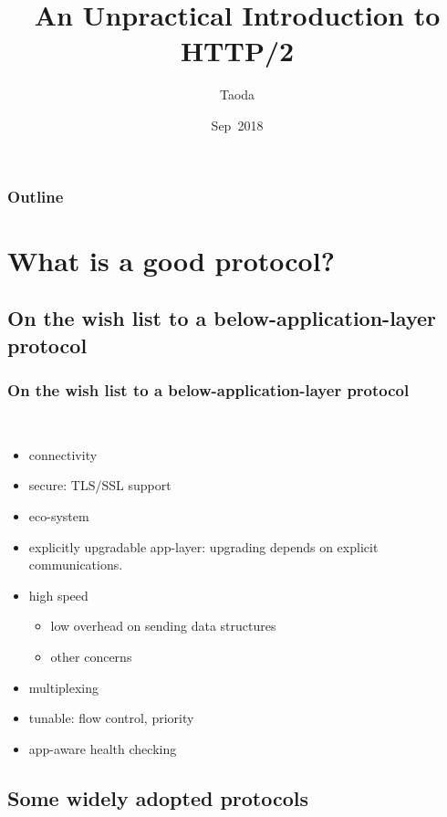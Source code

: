 \documentclass[lualatex]{beamer}
\title[HTTP/2]{An Unpractical Introduction to HTTP/2}
\author{Taoda}
\institute{YITU tech}
\date{Sep\ 2018}
\begin{document}
\begin{frame}
\titlepage
\end{frame}

\begin{frame}
  \frametitle{Outline}
  \tableofcontents
\end{frame}

\section{What is a good protocol?}
\subsection{On the wish list to a below-application-layer protocol}

\begin{frame}
  \frametitle{On the wish list to a below-application-layer protocol}

  \begin{block}{~}
    \begin{itemize}
    \item connectivity
    \item secure: TLS/SSL support
    \item eco-system
    \item explicitly upgradable app-layer: upgrading depends on explicit communications.
    \item high speed
      \begin{itemize}
      \item low overhead on sending data structures
      \item other concerns
      \end{itemize}
    \item multiplexing
    \item tunable: flow control, priority
    \item app-aware health checking
    \end{itemize}
  \end{block}
\end{frame}

\subsection{Some widely adopted protocols}
\end{document}
